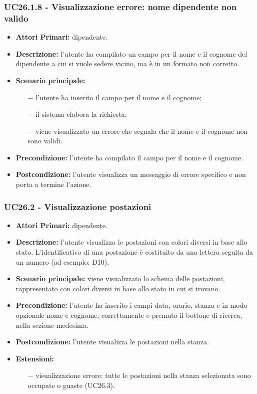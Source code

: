 \subsubsection{ UC26.1.8 - Visualizzazione errore: nome dipendente non valido }
\begin{itemize}
	\item\textbf{Attori Primari:} dipendente.
	\item\textbf{Descrizione:} l’utente ha compilato un campo per il nome e il cognome del dipendente a cui si vuole sedere vicino, ma è in un formato non corretto.
	\item\textbf{Scenario principale:} 
	\begin{itemize}
		\item[$-$] l’utente ha inserito il campo per il nome e il cognome;
		\item[$-$] il sistema elabora la richiesta;
		\item[$-$] viene visualizzato un errore che segnala che  il nome e il cognome non sono validi.
	\end{itemize}
	\item\textbf{Precondizione:} l’utente ha compilato il campo per il nome e il cognome.
	\item\textbf{Postcondizione:} l’utente visualizza un messaggio di errore specifico e non porta a termine l’azione.
\end{itemize}
\subsubsection{ UC26.2 - Visualizzazione postazioni  }
\begin{itemize}
	\item\textbf{Attori Primari:} dipendente.
	\item\textbf{Descrizione:} l’utente visualizza le postazioni con colori diversi in base allo stato. L'identificativo di una postazione è costituito da una lettera seguita da un numero (ad esempio: D10). 
	\item\textbf{Scenario principale:} viene visualizzato lo schema delle postazioni, rappresentato con colori diversi in base allo stato in cui si trovano.
	\item\textbf{Precondizione:} l’utente ha inserito i campi data, orario, stanza e in modo opzionale nome e cognome, correttamente e premuto il bottone di ricerca, nella sezione 
	medesima.
	\item\textbf{Postcondizione:} l’utente visualizza le postazioni nella stanza.
	\item\textbf{Estensioni:}
	\begin{itemize}
		\item[$-$] visualizzazione errore: tutte le postazioni nella stanza selezionata sono occupate o guaste (UC26.3).
	\end{itemize}
\end{itemize}
